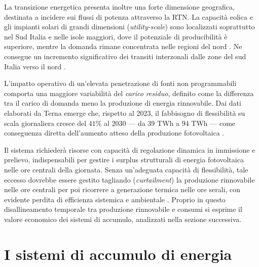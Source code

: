 
La transizione energetica presenta inoltre una forte dimensione geografica, destinata a incidere sui flussi di potenza attraverso la \ac{RTN}. La capacità eolica e gli impianti solari di grandi dimensioni (\emph{utility-scale}) sono localizzati soprattutto nel Sud Italia e nelle isole maggiori, dove il potenziale di producibilità è superiore, mentre la domanda rimane concentrata nelle regioni del nord \cite{terna2025pds}. Ne consegue un incremento significativo dei transiti interzonali dalle zone del sud Italia verso il nord \cite{terna2025pds}. 


L'impatto operativo di un'elevata penetrazione di fonti non programmabili comporta una maggiore variabilità del \emph{carico residuo}, definito come la differenza tra il carico di domanda meno la produzione di energia rinnovabile. 
Dai dati elaborati da Terna emerge che, rispetto al 2023, il fabbisogno di flessibilità su scala giornaliera cresce del $41 \%$ al 2030 — da $39$ TWh a $94$ TWh — come conseguenza diretta dell'aumento atteso della produzione fotovoltaica \cite{terna2025pds}. 

Il sistema richiederà risorse con capacità di regolazione dinamica in immissione e prelievo, indispensabili per gestire i surplus strutturali di energia fotovoltaica nelle ore centrali della giornata. Senza un'adeguata capacità di flessibilità, tale eccesso dovrebbe essere gestito tagliando (\emph{curtailment}) la produzione rinnovabile nelle ore centrali per poi ricorrere a generazione termica nelle ore serali, con evidente perdita di efficienza sistemica e ambientale \cite{terna2025pds}. Proprio in questo disallineamento temporale tra produzione rinnovabile e consumi si esprime il valore economico dei sistemi di accumulo, analizzati nella sezione successiva.


\section{I sistemi di accumulo di energia}
\label{sec:bess}

